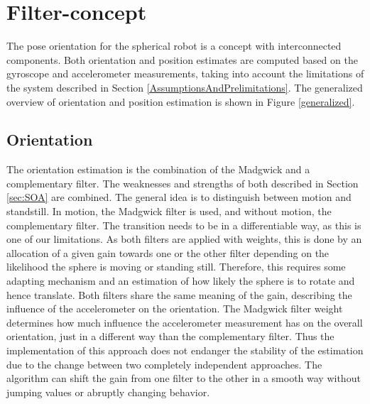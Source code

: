 \documentclass[letterpaper, 10 pt, conference]{ieeeconf}  %
\begin{document}
\section{Filter-concept}
The pose orientation for the spherical robot is a concept with interconnected components.
Both orientation and position estimates are computed based on the gyroscope and accelerometer measurements, taking into account the limitations of the system described in Section \ref{AssumptionsAndPrelimitations}.
The generalized overview of orientation and position estimation is shown in Figure \ref{generalized}.

\subsection{Orientation}
The orientation estimation is the combination of the Madgwick and a complementary filter.
The weaknesses and strengths of both described in Section \ref{sec:SOA} are combined. 
The general idea is to distinguish between motion and standstill.
In motion, the Madgwick filter is used, and without motion, the complementary filter.
The transition needs to be in a differentiable way, as this is one of our limitations.  
As both filters are applied with weights, this is done by an allocation of a given gain towards one or the other filter depending on the likelihood the sphere is moving or standing still. 
Therefore, this requires some adapting mechanism and an estimation of how likely the sphere is to rotate and hence translate.
Both filters share the same meaning of the gain, describing the influence of the accelerometer on the orientation.
The Madgwick filter weight determines how much influence the accelerometer measurement has on the overall orientation, just in a different way than the complementary filter.
Thus the implementation of this approach does not endanger the stability of the estimation due to the change between two completely independent approaches.
The algorithm can shift the gain from one filter to the other in a smooth way without jumping values or abruptly changing behavior. 
\end{document}

